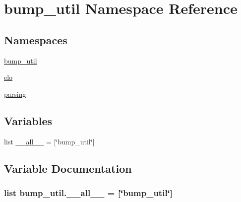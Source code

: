 \hypertarget{namespacebump__util}{}\section{bump\+\_\+util Namespace Reference}
\label{namespacebump__util}
\subsection*{Namespaces}
\begin{DoxyCompactItemize}
\item 
 \hyperlink{namespacebump__util_1_1bump__util}{bump\+\_\+util}
\item 
 \hyperlink{namespacebump__util_1_1elo}{elo}
\item 
 \hyperlink{namespacebump__util_1_1parsing}{parsing}
\end{DoxyCompactItemize}
\subsection*{Variables}
\begin{DoxyCompactItemize}
\item 
list \hyperlink{namespacebump__util_a96adc8b037cfc9874e4f1b236f5974d3}{\+\_\+\+\_\+all\+\_\+\+\_\+} = \mbox{[}\char`\"{}bump\+\_\+util\char`\"{}\mbox{]}
\end{DoxyCompactItemize}


\subsection{Variable Documentation}
\hypertarget{namespacebump__util_a96adc8b037cfc9874e4f1b236f5974d3}{}
\subsubsection[{\+\_\+\+\_\+all\+\_\+\+\_\+}]{\setlength{\rightskip}{0pt plus 5cm}list bump\+\_\+util.\+\_\+\+\_\+all\+\_\+\+\_\+ = \mbox{[}\char`\"{}bump\+\_\+util\char`\"{}\mbox{]}}\label{namespacebump__util_a96adc8b037cfc9874e4f1b236f5974d3}
